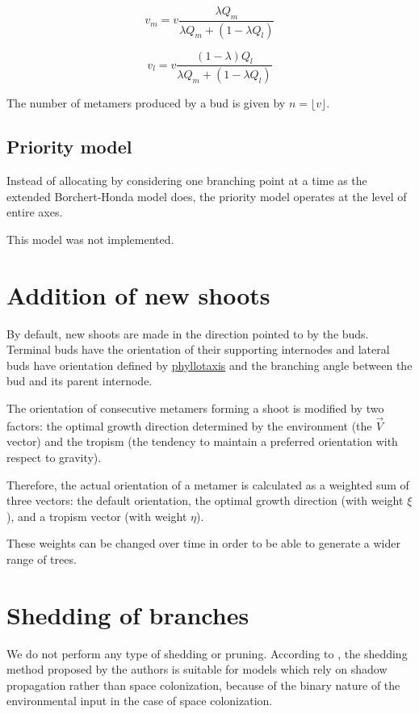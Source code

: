\documentclass{article}
\begin{document}
\[v_m = v \frac{\lambda Q_m}{\lambda Q_m + (1 - \lambda Q_l)}\]

\[v_l = v \frac{(1 - \lambda) Q_l}{\lambda Q_m + (1 - \lambda Q_l)}\]

The number of metamers produced by a bud is given by \(n = \lfloor v \rfloor\).

\subsection{Priority model}

Instead of allocating by considering one branching point at a time as the extended Borchert-Honda model does, the priority model operates at the level of entire axes.

This model was not implemented.

\section{Addition of new shoots}

By default, new shoots are made in the direction pointed to by the buds.
Terminal buds have the orientation of their supporting internodes and lateral buds have orientation defined by \href{https://en.wikipedia.org/wiki/Phyllotaxis}{phyllotaxis} and the branching angle between the bud and its parent internode.

The orientation of consecutive metamers forming a shoot is modified by two factors: the optimal growth direction determined by the environment (the \(\vec{V}\) vector) and the tropism (the tendency to maintain a preferred orientation with respect to gravity).

Therefore, the actual orientation of a metamer is calculated as a weighted sum of three vectors: the default orientation, the optimal growth direction (with weight \(\xi\)), and a tropism vector (with weight \(\eta\)).

These weights can be changed over time in order to be able to generate a wider range of trees.

\section{Shedding of branches}

We do not perform any type of shedding or pruning. According to \cite{Palubicki2009}, the shedding method proposed by the authors is suitable for models which rely on shadow propagation rather than space colonization, because of the binary nature of the environmental input in the case of space colonization.
\end{document}

